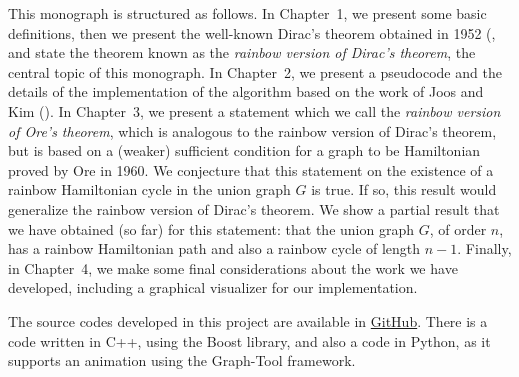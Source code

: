 This monograph is structured as follows. In Chapter~1, we present some basic definitions, then we
present the well-known Dirac's theorem obtained in 1952 (\cite{dirac1952}, and state the theorem
known as the \emph{rainbow version of Dirac's theorem}, the central topic of this monograph.  In
Chapter~2, we present a pseudocode and the details of the implementation of the algorithm based on
the work of Joos and Kim (\cite{Joos_2020}).  In Chapter~3, we present a statement which we call the
\emph{rainbow version of Ore's theorem}, which is analogous to the rainbow version of Dirac's
theorem, but is based on a (weaker) sufficient condition for a graph to be Hamiltonian proved by Ore
in 1960.  We conjecture that this statement on the existence of a rainbow Hamiltonian cycle in the
union graph $G$ is true. If so, this result would generalize the rainbow version of Dirac's
theorem. We show a partial result that we have obtained (so far) for this statement: that the union
graph $G$, of order $n$, has a rainbow Hamiltonian path and also  a rainbow cycle of length
$n-1$.  Finally, in Chapter~4, we make some final considerations about the work we have developed,
including a graphical visualizer for our implementation.

The source codes developed in this project are available in
\href{https://github.com/wmrmrx/TCC}{GitHub}. There is a code written in C++, using the Boost
library, and also a code in Python, as it supports an animation using the Graph-Tool framework.
